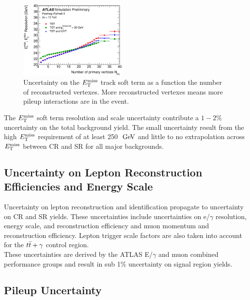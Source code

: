 \begin{figure}[!htbp]
\begin{center}
\includegraphics[width=0.48\textwidth]{figures/METCalib/MET_TST_tt.eps}
\caption[Uncertainty on the $\met$ track soft term as a function the number of reconstructed vertexes.]{Uncertainty on the $\met$ track soft term as a function the number of reconstructed vertexes.  More reconstructed vertexes means more pileup interactions are in the event. }
\label{fig:sys:MET_TST_tt}
\end{center}
\end{figure}

\indent The $\met$ soft term resolution and scale uncertainty contribute a $1-2\%$ uncertainty on the total background yield.  The small uncertainty result from the high $\met$ requirement of at least 250 $\gev$ and little to no extrapolation across $\met$ between CR and SR for all major backgrounds. \\

\subsection{Uncertainty on Lepton Reconstruction Efficiencies and Energy Scale}

\indent Uncertainty on lepton reconstruction and identification propagate to uncertainty on CR and SR yields.  These uncertainties include uncertainties on e/$\gamma$ resolution, energy scale, and reconstruction efficiency and muon momentum and reconstruction efficiency.  Lepton trigger scale factors are also taken into account for the $t\bar{t}+\gamma$ control region. \\

\indent These uncertainties are derived by the ATLAS E/$\gamma$ and muon combined performance groups and result in sub 1\% uncertainty on signal region yields.\cite{MuonReco,EleID} \\

\subsection{Pileup Uncertainty}

